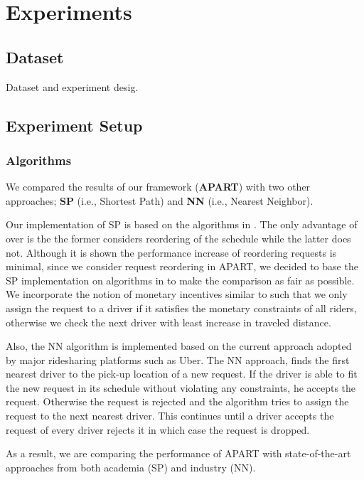 \section{Experiments}

\subsection{Dataset}
Dataset and experiment desig.

\subsection{Experiment Setup}

\subsubsection{Algorithms}
We compared the results of our framework (\textbf{APART}) with two other approaches; \textbf{SP} (i.e., Shortest Path) and \textbf{NN} (i.e., Nearest Neighbor).

Our implementation of SP is based on the algorithms in \cite{Huang14}. The only advantage of \cite{Huang14} over \cite{Ma13} is the the former considers reordering of the schedule while the latter does not. Although it is shown the performance increase of reordering requests is minimal, since we consider request reordering in APART, we decided to base the SP implementation on algorithms in \cite{Huang14} to make the comparison as fair as possible. We incorporate the notion of monetary incentives similar to \cite{Ma15} such that we only assign the request to a driver if it satisfies the monetary constraints of all riders, otherwise we check the next driver with least increase in traveled distance.

Also, the NN algorithm is implemented based on the current approach adopted by major ridesharing platforms such as Uber. The NN approach, finds the first nearest driver to the pick-up location of a new request. If the driver is able to fit the new request in its schedule without violating any constraints, he accepts the request. Otherwise the request is rejected and the algorithm tries to assign the request to the next nearest driver. This continues until a driver accepts the request of every driver rejects it in which case the request is dropped.

As a result, we are comparing the performance of APART with state-of-the-art approaches from both academia (SP) and industry (NN).

